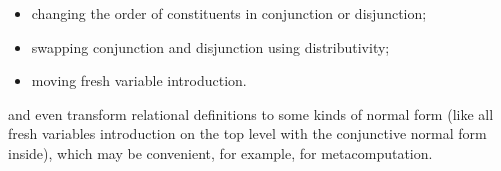 \begin{itemize}
\item changing the order of constituents in conjunction or disjunction;
\item swapping conjunction and disjunction using distributivity;
\item moving fresh variable introduction.
\end{itemize}

and even transform relational definitions to some kinds of normal form (like all fresh variables introduction on the top level with the
conjunctive normal form inside), which may be convenient, for example, for metacomputation.
